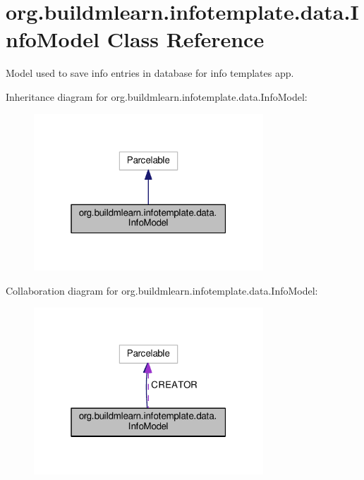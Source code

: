 \hypertarget{classorg_1_1buildmlearn_1_1infotemplate_1_1data_1_1InfoModel}{}\section{org.\+buildmlearn.\+infotemplate.\+data.\+Info\+Model Class Reference}
\label{classorg_1_1buildmlearn_1_1infotemplate_1_1data_1_1InfoModel}


Model used to save info entries in database for info template\textquotesingle{}s app.  




Inheritance diagram for org.\+buildmlearn.\+infotemplate.\+data.\+Info\+Model\+:
\nopagebreak
\begin{figure}[H]
\begin{center}
\leavevmode
\includegraphics[width=244pt]{classorg_1_1buildmlearn_1_1infotemplate_1_1data_1_1InfoModel__inherit__graph}
\end{center}
\end{figure}


Collaboration diagram for org.\+buildmlearn.\+infotemplate.\+data.\+Info\+Model\+:
\nopagebreak
\begin{figure}[H]
\begin{center}
\leavevmode
\includegraphics[width=244pt]{classorg_1_1buildmlearn_1_1infotemplate_1_1data_1_1InfoModel__coll__graph}
\end{center}
\end{figure}
